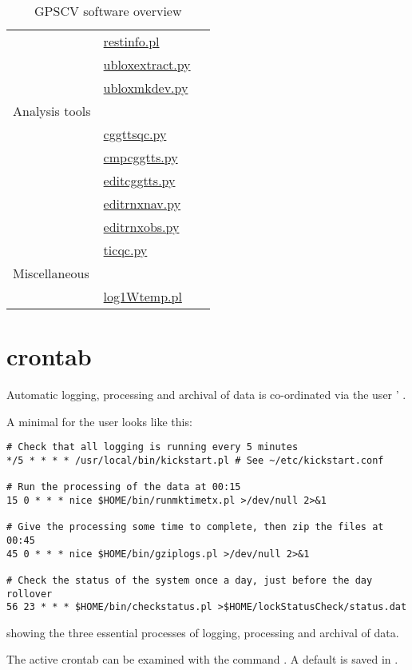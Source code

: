 \begin{table}
\begin{tabular}{l|l|l}
	& \hyperlink{h:restinfo}{restinfo.pl} & \\
	& \hyperlink{h:ubloxextract}{ubloxextract.py} & \\
	& \hyperlink{h:ubloxmkdev}{ubloxmkdev.py} & \\
	\hline
Analysis tools & & \\
	& \hyperlink{h:cggttsqc}{cggttsqc.py} & \\
	& \hyperlink{h:cmpcggtts}{cmpcggtts.py} & \\
	& \hyperlink{h:editcggtts}{editcggtts.py} & \\
	& \hyperlink{h:editrnxnav}{editrnxnav.py} & \\
	& \hyperlink{h:editrnxobs}{editrnxobs.py} & \\
	& \hyperlink{h:ticqc}{ticqc.py} & \\
Miscellaneous & & \\
  & \hyperlink{h:log1Wtemp}{log1Wtemp.pl} & \\ 
	\hline
\end{tabular}
\caption{GPSCV software overview \label{t:OTTPSoftware} }
\end{table}

\section{crontab \label{ss:crontab}}

Automatic logging, processing and archival of data is co-ordinated via the user ' .

A minimal  for the user  looks like this:
\begin{lstlisting}
# Check that all logging is running every 5 minutes
*/5 * * * * /usr/local/bin/kickstart.pl # See ~/etc/kickstart.conf

# Run the processing of the data at 00:15
15 0 * * * nice $HOME/bin/runmktimetx.pl >/dev/null 2>&1 

# Give the processing some time to complete, then zip the files at 00:45
45 0 * * * nice $HOME/bin/gziplogs.pl >/dev/null 2>&1

# Check the status of the system once a day, just before the day rollover
56 23 * * * $HOME/bin/checkstatus.pl >$HOME/lockStatusCheck/status.dat
\end{lstlisting}
showing the three essential processes of logging, processing and archival of data.

The active crontab can be examined with the command . 
A default  is saved in . 

